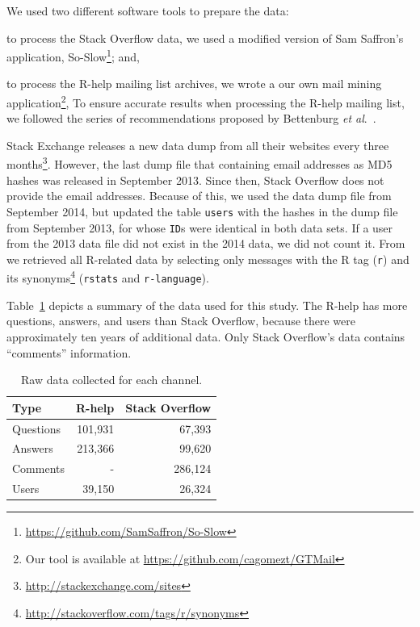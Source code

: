 	We used two different software tools to prepare the data:
	\begin{enumerate*}[label=(\arabic*)]
	\item to process the Stack Overflow data, we used a modified version of Sam Saffron's application, So-Slow\footnote{\url{https://github.com/SamSaffron/So-Slow}}; and,
	\item to process the R-help mailing list archives, we wrote a our own mail mining application\footnote{Our tool is available at
            \url{https://github.com/cagomezt/GTMail}}, To ensure accurate results when processing the R-help mailing list, we followed the series of recommendations proposed by Bettenburg \textit{et al}.~\cite{Bettenburg2009}.
	\end{enumerate*}


    
Stack Exchange releases a new data dump from all their websites every three months\footnote{\url{http://stackexchange.com/sites}}.
However, the last dump file that containing email addresses as MD5 hashes was released in September 2013.
Since then, Stack Overflow does not provide the email addresses.
Because of this, we used the data dump file from September 2014, but updated the table \texttt{users} with the hashes in the dump file from September 2013, for whose \texttt{ID}s were identical in both data sets.
If a user from the 2013 data file did not exist in the 2014 data, we did not count it.
From \SO we retrieved all R-related data by selecting only messages with the R tag (\texttt{r}) and its synonyms\footnote{\url{http://stackoverflow.com/tags/r/synonyms}} (\texttt{rstats} and \texttt{r-language}).

	Table~\ref{table:data} depicts a summary of the data used for this study.
	The R-help has more questions, answers, and users than Stack Overflow, because there were approximately ten years of additional data.
	Only Stack Overflow's data contains ``comments'' information.

	\begin{table}[!htb]
	  \centering
      \caption{Raw data collected for each channel.}
      \begin{small}
        \begin{tabular}{lrr}
	        \toprule
	        Type          &  R-help & Stack Overflow \\
	        \midrule
	        Questions     & 101,931 &  67,393 \\
	        Answers       & 213,366 &  99,620 \\
	        Comments      &       - & 286,124 \\
	        Users         &  39,150 &  26,324 \\
	        \bottomrule
        \end{tabular}
      \end{small}
	  \label{table:data}
	\end{table}

